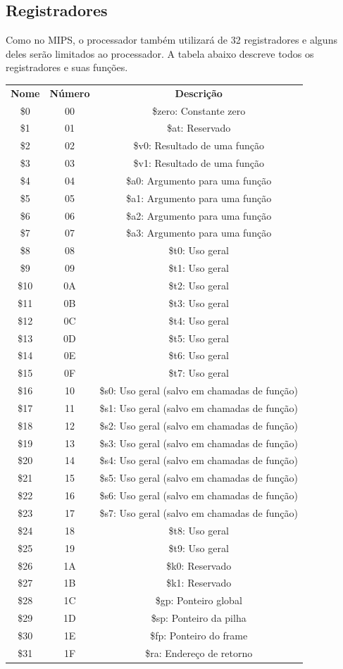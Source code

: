 \documentclass[a4paper, 12pt]{article}
\begin{document}
\subsection{Registradores}
Como no MIPS, o processador também utilizará de 32 registradores e alguns deles serão limitados ao processador. A tabela abaixo descreve todos os registradores e suas funções.
\begin{center}
\begin{tabular}{ ccc }
 	\textbf{Nome} & \textbf{Número} & \textbf{Descrição}\\
 	\$0 & 00 & \$zero: Constante zero\\
 	\$1 & 01 & \$at: Reservado\\
 	\$2 & 02 & \$v0: Resultado de uma função\\
 	\$3 & 03 & \$v1: Resultado de uma função\\
 	\$4 & 04 & \$a0: Argumento para uma função\\
 	\$5 & 05 & \$a1: Argumento para uma função\\
 	\$6 & 06 & \$a2: Argumento para uma função\\
 	\$7 & 07 & \$a3: Argumento para uma função\\
 	\$8 & 08 & \$t0: Uso geral\\
 	\$9 & 09 & \$t1: Uso geral\\
 	\$10 & 0A & \$t2: Uso geral\\
 	\$11 & 0B & \$t3: Uso geral\\
 	\$12 & 0C & \$t4: Uso geral\\
 	\$13 & 0D & \$t5: Uso geral\\
 	\$14 & 0E & \$t6: Uso geral\\
 	\$15 & 0F & \$t7: Uso geral\\
 	\$16 & 10 & \$s0: Uso geral (salvo em chamadas de função)\\
 	\$17 & 11 & \$s1: Uso geral (salvo em chamadas de função)\\
 	\$18 & 12 & \$s2: Uso geral (salvo em chamadas de função)\\
 	\$19 & 13 & \$s3: Uso geral (salvo em chamadas de função)\\
 	\$20 & 14 & \$s4: Uso geral (salvo em chamadas de função)\\
 	\$21 & 15 & \$s5: Uso geral (salvo em chamadas de função)\\
 	\$22 & 16 & \$s6: Uso geral (salvo em chamadas de função)\\
 	\$23 & 17 & \$s7: Uso geral (salvo em chamadas de função)\\
 	\$24 & 18 & \$t8: Uso geral\\
 	\$25 & 19 & \$t9: Uso geral\\
 	\$26 & 1A & \$k0: Reservado\\
 	\$27 & 1B & \$k1: Reservado\\
 	\$28 & 1C & \$gp: Ponteiro global\\
 	\$29 & 1D & \$sp: Ponteiro da pilha\\
 	\$30 & 1E & \$fp: Ponteiro do frame\\
 	\$31 & 1F & \$ra: Endereço de retorno\\
  \end{tabular}
\end{center}
\end{document}
